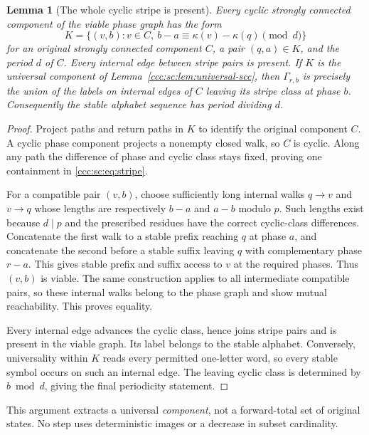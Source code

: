 \documentclass[11pt,letterpaper]{article}
\newtheorem{lemma}[theorem]{Lemma}
\theoremstyle{definition}
\theoremstyle{remark}
\begin{document}
\begin{lemma}[The whole cyclic stripe is present]\label{ccc:sc:lem:stripe}
Every cyclic strongly connected component of the viable phase graph has the form
\begin{equation}\label{ccc:sc:eq:stripe}
 K=\{(v,b):v\in C,\ b-a\equiv\kappa(v)-\kappa(q)\pmod d\}
\end{equation}
for an original strongly connected component $C$, a pair $(q,a)\in K$, and the period $d$ of $C$. Every internal edge between stripe pairs is present. If $K$ is the universal component of Lemma~\ref{ccc:sc:lem:universal-scc}, then $\Gamma_{r,b}$ is precisely the union of the labels on internal edges of $C$ leaving its stripe class at phase $b$. Consequently the stable alphabet sequence has period dividing $d$.
\end{lemma}
\begin{proof}
Project paths and return paths in $K$ to identify the original component $C$. A cyclic phase component projects a nonempty closed walk, so $C$ is cyclic. Along any path the difference of phase and cyclic class stays fixed, proving one containment in \eqref{ccc:sc:eq:stripe}.

For a compatible pair $(v,b)$, choose sufficiently long internal walks $q\to v$ and $v\to q$ whose lengths are respectively $b-a$ and $a-b$ modulo $p$. Such lengths exist because $d\mid p$ and the prescribed residues have the correct cyclic-class differences. Concatenate the first walk to a stable prefix reaching $q$ at phase $a$, and concatenate the second before a stable suffix leaving $q$ with complementary phase $r-a$. This gives stable prefix and suffix access to $v$ at the required phases. Thus $(v,b)$ is viable. The same construction applies to all intermediate compatible pairs, so these internal walks belong to the phase graph and show mutual reachability. This proves equality.

Every internal edge advances the cyclic class, hence joins stripe pairs and is present in the viable graph. Its label belongs to the stable alphabet. Conversely, universality within $K$ reads every permitted one-letter word, so every stable symbol occurs on such an internal edge. The leaving cyclic class is determined by $b\bmod d$, giving the final periodicity statement.
\end{proof}

This argument extracts a universal \emph{component}, not a forward-total set of original states. No step uses deterministic images or a decrease in subset cardinality.
\end{document}
